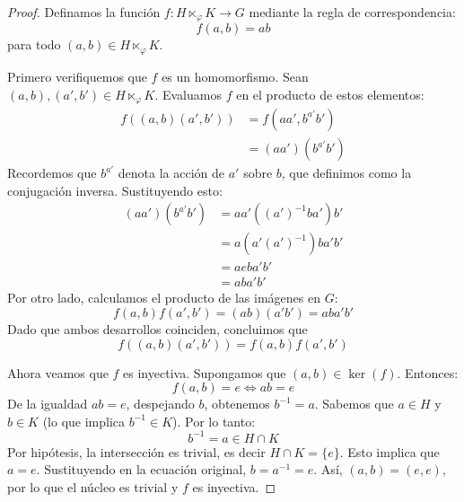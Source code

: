 
\begin{proof}
Definamos la función $f: H \ltimes_{\varphi} K \to G$ mediante la regla de correspondencia:
\begin{equation*}
f(a,b) = ab
\end{equation*}
para todo $(a,b) \in H \ltimes_{\varphi} K$.

Primero verifiquemos que $f$ es un homomorfismo.
Sean $(a,b), (a',b') \in H \ltimes_{\varphi} K$. Evaluamos $f$ en el producto de estos elementos:
\begin{align*}
f((a,b)(a',b')) &= f(aa', b^{a'}b') \\
&= (aa')(b^{a'}b')
\end{align*}
Recordemos que $b^{a'}$ denota la acción de $a'$ sobre $b$, que definimos como la conjugación inversa. Sustituyendo esto:
\begin{align*}
(aa')(b^{a'}b') &= a a' ((a')^{-1} b a') b' \\
&= a (a' (a')^{-1}) b a' b' \\
&= a e b a' b' \\
&= a b a' b'
\end{align*}
Por otro lado, calculamos el producto de las imágenes en $G$:
\begin{equation*}
f(a,b)f(a',b') = (ab)(a'b') = aba'b'
\end{equation*}
Dado que ambos desarrollos coinciden, concluimos que
\begin{equation*}
f((a,b)(a',b')) = f(a,b)f(a',b')
\end{equation*}

Ahora veamos que $f$ es inyectiva.
Supongamos que $(a,b) \in \ker(f)$. Entonces:
\begin{equation*}
f(a,b) = e \iff ab = e
\end{equation*}
De la igualdad $ab=e$, despejando $b$, obtenemos $b^{-1} = a$.
Sabemos que $a \in H$ y $b \in K$ (lo que implica $b^{-1} \in K$).
Por lo tanto:
\begin{equation*}
b^{-1} = a \in H \cap K
\end{equation*}
Por hipótesis, la intersección es trivial, es decir $H \cap K = \{e\}$. Esto implica que $a = e$.
Sustituyendo en la ecuación original, $b = a^{-1} = e$.
Así, $(a,b) = (e,e)$, por lo que el núcleo es trivial y $f$ es inyectiva.


\end{proof}
